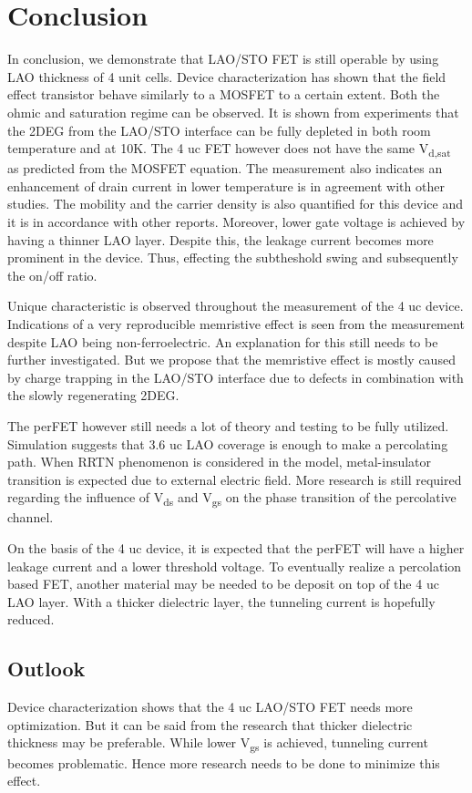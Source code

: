 \documentclass[11pt,a4paper]{report}
\begin{document}
\chapter{Conclusion}
In conclusion, we demonstrate that LAO/STO FET is still operable by using LAO thickness of 4 unit cells. Device characterization has shown that the field effect transistor behave similarly to a MOSFET to a certain extent. Both the ohmic and saturation regime can be observed. It is shown from experiments that the 2DEG from the LAO/STO interface can be fully depleted in both room temperature and at 10K. The 4 uc FET however does not have the same V\textsubscript{d,sat} as predicted from the MOSFET equation. The measurement also indicates an enhancement of drain current in lower temperature is in agreement with other studies. The mobility and the carrier density is also quantified for this device and it is in accordance with other reports. Moreover, lower gate voltage is achieved by having a thinner LAO layer. Despite this, the leakage current becomes more prominent in the device. Thus, effecting the subtheshold swing and subsequently the on/off ratio.

Unique characteristic is observed throughout the measurement of the 4 uc device. Indications of a very reproducible memristive effect is seen from the measurement despite LAO being non-ferroelectric. An explanation for this still needs to be further investigated. But we propose that the memristive effect is mostly caused by charge trapping in the LAO/STO interface due to defects in combination with the slowly regenerating 2DEG.

The perFET however still needs a lot of theory and testing to be fully utilized. Simulation suggests that 3.6 uc LAO coverage is enough to make a percolating path. When RRTN phenomenon is considered in the model, metal-insulator transition is expected due to external electric field. More research is still required regarding the influence of V\textsubscript{ds} and V\textsubscript{gs} on the phase transition of the percolative channel. 

On the basis of the 4 uc device, it is expected that the perFET will have a higher leakage current and a lower threshold voltage. To eventually realize a percolation based FET, another material may be needed to be deposit on top of the 4 uc LAO layer. With a thicker dielectric layer, the tunneling current is hopefully reduced.

\newpage
\section*{Outlook}
Device characterization shows that the 4 uc LAO/STO FET needs more optimization. But it can be said from the research that thicker dielectric thickness may be preferable. While lower V\textsubscript{gs} is achieved, tunneling current becomes problematic. Hence more research needs to be done to minimize this effect.
\end{document}
